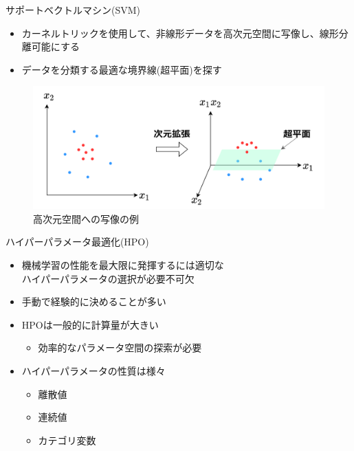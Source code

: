 \documentclass[12pt, cjk, dvipdfmx]{beamer}
\begin{document}
\begin{frame}
\begin{columns}[t]
\begin{column}{0.490\linewidth}
\begin{mybox}{サポートベクトルマシン(SVM)}
\begin{itemize}
        
                  \item カーネルトリックを使用して、非線形データを高次元空間に写像し、線形分離可能にする 
                  \item データを分類する最適な境界線(超平面)を探す                
                \end{itemize}
                \begin{figure}
                  \centering
                  \includegraphics[width=0.9\linewidth]{syazou.png}
                  \caption{高次元空間への写像の例}
                 \end{figure}
            \end{mybox}
            \begin{mybox}{ハイパーパラメータ最適化(HPO)}
              \begin{itemize}
                \item 機械学習の性能を最大限に発揮するには適切な\\ハイパーパラメータの選択が必要不可欠
                \item 手動で経験的に決めることが多い
                \item HPOは一般的に計算量が大きい
                \begin{itemize}
                  \item 効率的なパラメータ空間の探索が必要
                \end{itemize}
                \item ハイパーパラメータの性質は様々
                \begin{itemize}
                  \item 離散値
                  \item 連続値
                  \item カテゴリ変数
                \end{itemize}
              \end{itemize}

\end{mybox}
\end{column}
\end{columns}
\end{frame}
\end{document}

